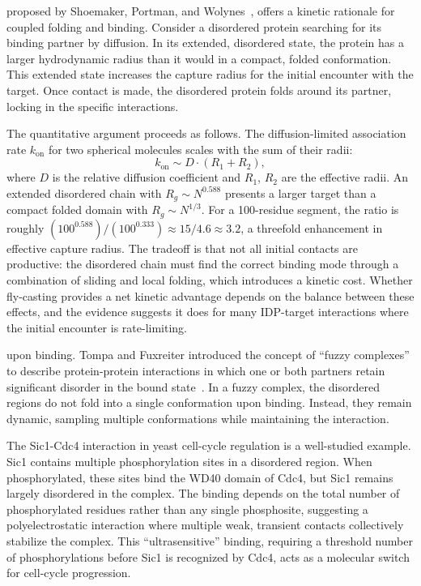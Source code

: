  proposed by Shoemaker, Portman, and
Wolynes~\cite{shoemaker2000}, offers a kinetic rationale for coupled folding and binding.
Consider a disordered protein searching for its binding partner by diffusion.  In its
extended, disordered state, the protein has a larger hydrodynamic radius than it would in a
compact, folded conformation.  This extended state increases the capture radius for the
initial encounter with the target.  Once contact is made, the disordered protein folds
around its partner, locking in the specific interactions.

The quantitative argument proceeds as follows.  The diffusion-limited association rate
$k_{\text{on}}$ for two spherical molecules scales with the sum of their radii:
%
\begin{equation}
  k_{\text{on}} \sim D \cdot (R_1 + R_2),
  \label{eq:fly-casting}
\end{equation}
%
\noindent where $D$ is the relative diffusion coefficient and $R_1$, $R_2$ are the effective
radii.  An extended disordered chain with $R_g \sim N^{0.588}$ presents a larger target than
a compact folded domain with $R_g \sim N^{1/3}$.  For a 100-residue segment, the ratio is
roughly $(100^{0.588}) / (100^{0.333}) \approx 15 / 4.6 \approx 3.2$, a threefold
enhancement in effective capture radius.  The tradeoff is that not all initial contacts are
productive: the disordered chain must find the correct binding mode through a combination of
sliding and local folding, which introduces a kinetic cost.  Whether fly-casting provides a
net kinetic advantage depends on the balance between these effects, and the evidence suggests
it does for many IDP-target interactions where the initial encounter is rate-limiting.

 upon binding.  Tompa and Fuxreiter introduced the
concept of ``fuzzy complexes'' to describe protein-protein interactions in which one or both
partners retain significant disorder in the bound state~\cite{tompa2005}.  In a fuzzy
complex, the disordered regions do not fold into a single conformation upon binding.
Instead, they remain dynamic, sampling multiple conformations while maintaining the
interaction.

The Sic1-Cdc4 interaction in yeast cell-cycle regulation is a well-studied example.  Sic1
contains multiple phosphorylation sites in a disordered region.  When phosphorylated, these
sites bind the WD40 domain of Cdc4, but Sic1 remains largely disordered in the complex.
The binding depends on the total number of phosphorylated residues rather than any single
phosphosite, suggesting a polyelectrostatic interaction where multiple weak, transient
contacts collectively stabilize the complex.  This ``ultrasensitive'' binding, requiring a
threshold number of phosphorylations before Sic1 is recognized by Cdc4, acts as a molecular
switch for cell-cycle progression.

